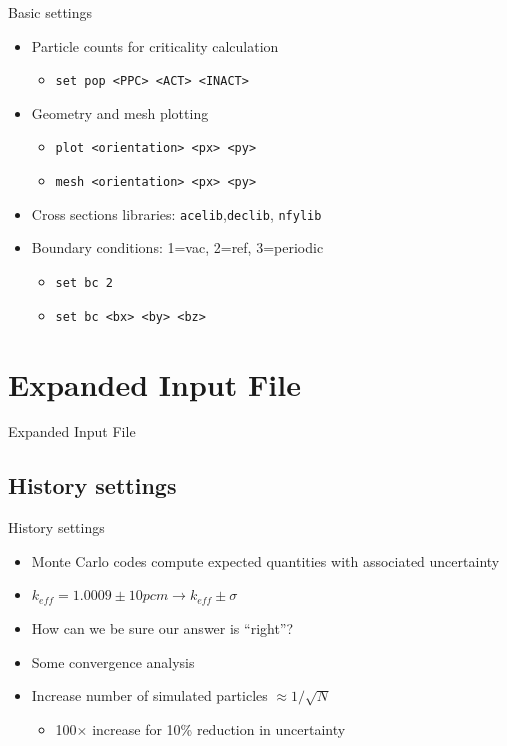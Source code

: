 \documentclass{beamer}
\begin{document}
\begin{frame}{Basic settings}
    \begin{itemize}
        \item{Particle counts for criticality calculation}
        \begin{itemize}
            \item{\texttt{set pop <PPC> <ACT> <INACT>}}
        \end{itemize}
        \item{Geometry and mesh plotting}
            \begin{itemize}
                \item{\texttt{plot <orientation> <px> <py>}}
                \item{\texttt{mesh <orientation> <px> <py>}}
            \end{itemize}
        \item{Cross sections libraries: \texttt{acelib},\texttt{declib}, \texttt{nfylib}}
        \item{Boundary conditions: 1=vac, 2=ref, 3=periodic}
            \begin{itemize}
                \item{\texttt{set bc 2}}
                \item{\texttt{set bc <bx> <by> <bz>}}
            \end{itemize}
    \end{itemize}
\end{frame}

\section{Expanded Input File}

\begin{frame}{Expanded Input File}
    \tableofcontents[sectionstyle=show/hide,subsectionstyle=show/show/hide]
\end{frame}

\subsection{History settings}

\begin{frame}{History settings}
    \begin{itemize}
        \item Monte Carlo codes compute expected quantities with associated uncertainty
        \item $k_{eff}=1.0009\pm 10 pcm \rightarrow k_{eff} \pm \sigma$
        \item How can we be sure our answer is ``right''?
        \item Some convergence analysis
        \item Increase number of simulated particles $\approx 1/\sqrt{N}$
        \begin{itemize}
            \item 100$\times$ increase for 10\% reduction in uncertainty
        \end{itemize}
    \end{itemize}
\end{frame}
\end{document}
